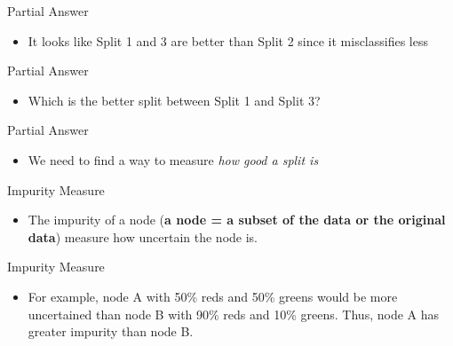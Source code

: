 \documentclass[
  ignorenonframetext,
]{beamer}
\providecommand{\tightlist}{%
  \setlength{\itemsep}{0pt}\setlength{\parskip}{0pt}}
\begin{document}
\begin{frame}{Partial Answer}
\protect\hypertarget{partial-answer}{}

\begin{itemize}
\tightlist
\item
  It looks like Split 1 and 3 are better than Split 2 since it
  misclassifies less
\end{itemize}

\end{frame}

\begin{frame}{Partial Answer}
\protect\hypertarget{partial-answer-1}{}

\begin{itemize}
\tightlist
\item
  Which is the better split between Split 1 and Split 3?
\end{itemize}

\end{frame}

\begin{frame}{Partial Answer}
\protect\hypertarget{partial-answer-2}{}

\begin{itemize}
\tightlist
\item
  We need to find a way to measure \emph{how good a split is}
\end{itemize}

\end{frame}

\begin{frame}{Impurity Measure}
\protect\hypertarget{impurity-measure}{}

\begin{itemize}
\tightlist
\item
  The impurity of a node (\textbf{a node = a subset of the data or the
  original data}) measure how uncertain the node is.
\end{itemize}

\end{frame}

\begin{frame}{Impurity Measure}
\protect\hypertarget{impurity-measure-1}{}

\begin{itemize}
\tightlist
\item
  For example, node A with 50\% reds and 50\% greens would be more
  uncertained than node B with 90\% reds and 10\% greens. Thus, node A
  has greater impurity than node B.
\end{itemize}

\end{frame}
\end{document}

